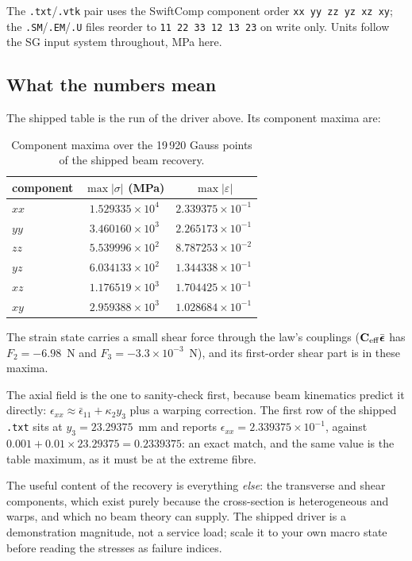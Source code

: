 The \texttt{.txt}/\texttt{.vtk} pair uses the SwiftComp component order
\texttt{xx yy zz yz xz xy}; the \texttt{.SM}/\texttt{.EM}/\texttt{.U} files
reorder to \texttt{11 22 33 12 13 23} on write only. Units follow the SG input
system throughout, MPa here.

\subsection{What the numbers mean}

The shipped table is the run of the driver above. Its component maxima are:

\begin{table}[htbp]
\centering
\small
\begin{tabular}{lcc}
\toprule
component & $\max\lvert\sigma\rvert$ (MPa) & $\max\lvert\varepsilon\rvert$ \\
\midrule
$xx$ & $1.529335\times10^{4}$ & $2.339375\times10^{-1}$ \\
$yy$ & $3.460160\times10^{3}$ & $2.265173\times10^{-1}$ \\
$zz$ & $5.539996\times10^{2}$ & $8.787253\times10^{-2}$ \\
$yz$ & $6.034133\times10^{2}$ & $1.344338\times10^{-1}$ \\
$xz$ & $1.176519\times10^{3}$ & $1.704425\times10^{-1}$ \\
$xy$ & $2.959388\times10^{3}$ & $1.028684\times10^{-1}$ \\
\bottomrule
\end{tabular}
\caption{Component maxima over the 19\,920 Gauss points of the shipped beam
recovery.}
\label{tab:solid-ex8max}
\end{table}

The strain state carries a small shear force through the law's couplings
($\mathbf{C}_{\rm eff}\bar{\boldsymbol{\epsilon}}$ has $F_2 = -6.98$~N and
$F_3 = -3.3\times10^{-3}$~N), and its first-order shear part is in these
maxima.

The axial field is the one to sanity-check first, because beam kinematics
predict it directly: $\epsilon_{xx} \approx \bar{\epsilon}_{11}
+ \kappa_2 y_3$ plus a warping correction. The first row of the shipped
\texttt{.txt} sits at $y_3 = 23.29375$~mm and reports
$\epsilon_{xx} = 2.339375\times10^{-1}$, against
$0.001 + 0.01 \times 23.29375 = 0.2339375$: an exact match, and the same value
is the table maximum, as it must be at the extreme fibre.

The useful content of the recovery is everything \emph{else}: the transverse and
shear components, which exist purely because the cross-section is heterogeneous
and warps, and which no beam theory can supply. The shipped driver is a
demonstration magnitude, not a service load; scale it to your own macro state
before reading the stresses as failure indices.

